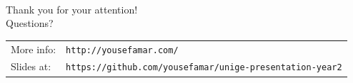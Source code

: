 \documentclass[aspectratio=169]{beamer}
\begin{document}
\begin{frame}[plain,c]
	\begin{center}
		\\[4em]
		\Huge Thank you for your attention!\\[1em]
		\Large Questions?\\[1em]
	\end{center}
	\footnotesize
	\begin{table}[]
		\begin{tabular}{ll}
			More info:&\texttt{http://yousefamar.com/}\\
			Slides at:&\texttt{https://github.com/yousefamar/unige-presentation-year2}
		\end{tabular}
	\end{table}
\end{frame}
\end{document}
